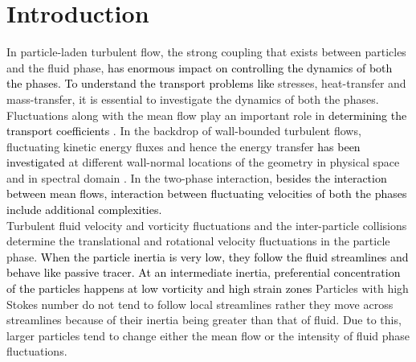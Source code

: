 \documentclass[aip,graphicx]{revtex4-1}
\begin{document}
\section {Introduction}
   In particle-laden turbulent flow, the strong  coupling that exists between particles
   and the fluid phase, \textcolor{black}{has enormous impact on controlling the dynamics of both the phases. To understand the transport problems like} 
   stresses, heat-transfer and mass-transfer, it is essential to investigate the dynamics of both the phases. Fluctuations along with the mean flow play an important role in \textcolor{black}{determining the transport coefficients} . In the backdrop of wall-bounded turbulent flows, fluctuating kinetic energy fluxes and hence the energy transfer \textcolor{black}{has been investigated} at different wall-normal locations of the geometry in physical space \citep*{marati2004energy} and in spectral domain \citep*{andrade2018analyzing}. 
   In the two-phase interaction, \textcolor{black}{besides the interaction between mean flows, interaction between fluctuating velocities of both the phases include additional complexities.}
   \\ Turbulent fluid velocity and vorticity fluctuations and the inter-particle collisions determine the translational and rotational velocity fluctuations in the particle phase. 
\textcolor{black}{When the particle inertia is very low, they follow the fluid streamlines and behave like passive tracer. At an intermediate inertia, preferential concentration of the particles happens at low vorticity and high strain zones \citep{squires1991preferential,fessler1994preferential}}  Particles with high Stokes number do not tend to follow local streamlines rather they move across streamlines because of their inertia being greater than that of fluid. Due to this, larger particles tend to change either the mean flow or the intensity of fluid phase fluctuations.
\end{document}

